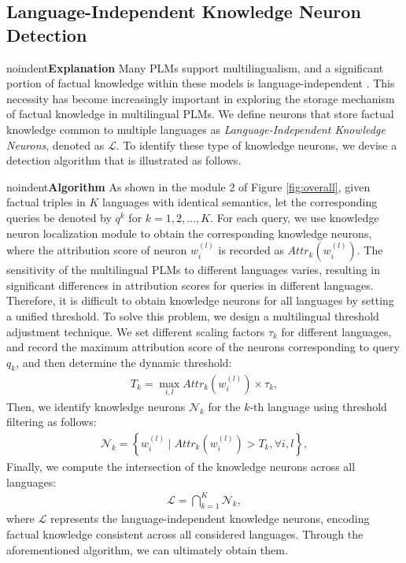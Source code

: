 \documentclass[]{article}
\newcommand{\vpara}[1]{noindent\textbf{#1 }}%
\begin{document}
\subsection{Language-Independent Knowledge Neuron Detection}
\vpara{Explanation} Many PLMs support multilingualism, and a significant portion of factual knowledge within these models is language-independent \cite{m-language-edit, wang-etal-2020-negative}. This necessity has become increasingly important in exploring the storage mechanism of factual knowledge in multilingual PLMs. We define neurons that store factual knowledge common to multiple languages as \textit{Language-Independent Knowledge Neurons}, denoted as $\mathcal{L}$. To identify these type of knowledge neurons, we devise a detection algorithm that is illustrated as follows.

\vpara{Algorithm} As shown in the module 2 of Figure \ref{fig:overall}, given factual triples in $K$ languages with identical semantics, let the corresponding queries be denoted by $q^k$ for $k=1, 2, \ldots, K$. For each query, we use knowledge neuron localization module to obtain the corresponding knowledge neurons, where the attribution score of neuron $w_i^{(l)}$ is recorded as $Attr_k(w_i^{(l)})$. The sensitivity of the multilingual PLMs to different languages varies, resulting in significant differences in attribution scores for queries in different languages. Therefore, it is difficult to obtain knowledge neurons for all languages by setting a unified threshold. To solve this problem, we design a multilingual threshold adjustment technique. We set different scaling factors $\tau_k$ for different languages, and record the maximum attribution score of the neurons corresponding to query $q_k$, and then determine the dynamic threshold:
{\small\begin{align}
T_k = \max_{i, l} Attr_k(w_i^{(l)}) \times \tau_k,
\end{align}}Then, we identify knowledge neurons \(\mathcal{N}_k\) for the \(k\)-th language using threshold filtering as follows:
{\small\begin{align}
\mathcal{N}_k = \left\{ w_i^{(l)} \mid  Attr_k(w_i^{(l)}) > T_k,  \forall i, l \right\},
\end{align}}Finally, we compute the intersection of the knowledge neurons across all languages:
{\small\begin{align}
\mathcal{L} = \bigcap_{k=1}^{K} \mathcal{N}_k,
\end{align} }where $\mathcal{L}$ represents the language-independent knowledge neurons, encoding factual knowledge consistent across all considered languages. Through the aforementioned algorithm, we can ultimately obtain them.
\end{document}
